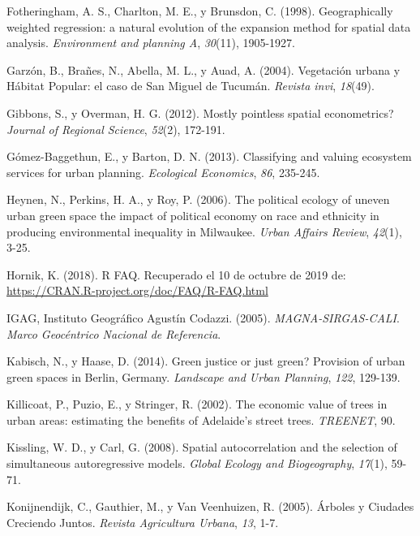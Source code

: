 \documentclass[12pt,a4paper,openany]{book}
\theoremstyle{definition}
\theoremstyle{definition}
\theoremstyle{definition}
\theoremstyle{remark}
\begin{document}
\hypertarget{ref-fotheringham_geographically_1998}{}
Fotheringham, A. S., Charlton, M. E., y Brunsdon, C. (1998).
Geographically weighted regression: a natural evolution of the expansion
method for spatial data analysis. \emph{Environment and planning A},
\emph{30}(11), 1905-1927.

\hypertarget{ref-garzon2004vegetacion}{}
Garzón, B., Brañes, N., Abella, M. L., y Auad, A. (2004). Vegetación
urbana y Hábitat Popular: el caso de San Miguel de Tucumán.
\emph{Revista invi}, \emph{18}(49).

\hypertarget{ref-gibbons_mostly_2012}{}
Gibbons, S., y Overman, H. G. (2012). Mostly pointless spatial
econometrics? \emph{Journal of Regional Science}, \emph{52}(2), 172-191.

\hypertarget{ref-gomez-baggethun_classifying_2013}{}
Gómez-Baggethun, E., y Barton, D. N. (2013). Classifying and valuing
ecosystem services for urban planning. \emph{Ecological Economics},
\emph{86}, 235-245.

\hypertarget{ref-heynen_political_2006}{}
Heynen, N., Perkins, H. A., y Roy, P. (2006). The political ecology of
uneven urban green space the impact of political economy on race and
ethnicity in producing environmental inequality in Milwaukee.
\emph{Urban Affairs Review}, \emph{42}(1), 3-25.

\hypertarget{ref-R-cran}{}
Hornik, K. (2018). R FAQ. Recuperado el 10 de octubre de 2019 de:
\url{https://CRAN.R-project.org/doc/FAQ/R-FAQ.html}

\hypertarget{ref-igagMC2005}{}
IGAG, Instituto Geográfico Agustín Codazzi. (2005).
\emph{MAGNA-SIRGAS-CALI}. \emph{Marco Geocéntrico Nacional de
Referencia}.

\hypertarget{ref-kabisch_green_2014}{}
Kabisch, N., y Haase, D. (2014). Green justice or just green? Provision
of urban green spaces in Berlin, Germany. \emph{Landscape and Urban
Planning}, \emph{122}, 129-139.

\hypertarget{ref-killicoat_economic_2002}{}
Killicoat, P., Puzio, E., y Stringer, R. (2002). The economic value of
trees in urban areas: estimating the benefits of Adelaide's street
trees. \emph{TREENET}, 90.

\hypertarget{ref-kissling_spatial_2008}{}
Kissling, W. D., y Carl, G. (2008). Spatial autocorrelation and the
selection of simultaneous autoregressive models. \emph{Global Ecology
and Biogeography}, \emph{17}(1), 59-71.

\hypertarget{ref-konijnendijk_arboles_2005}{}
Konijnendijk, C., Gauthier, M., y Van Veenhuizen, R. (2005). Árboles y
Ciudades Creciendo Juntos. \emph{Revista Agricultura Urbana}, \emph{13},
1-7.
\end{document}

